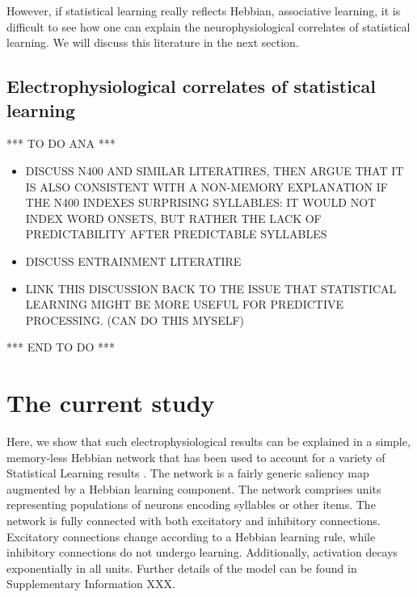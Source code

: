 \documentclass[
]{article}
\providecommand{\tightlist}{%
  \setlength{\itemsep}{0pt}\setlength{\parskip}{0pt}}
\begin{document}
However, if statistical learning really reflects Hebbian, associative
learning, it is difficult to see how one can explain the
neurophysiological correlates of statistical learning. We will discuss
this literature in the next section.

\hypertarget{electrophysiological-correlates-of-statistical-learning}{%
\subsection{Electrophysiological correlates of statistical
learning}\label{electrophysiological-correlates-of-statistical-learning}}

*** TO DO ANA ***

\citep{Batterink2017, Buiatti2009, Flo2022, Kabdebon2015, Moser2021}

\begin{itemize}
\tightlist
\item
  DISCUSS N400 AND SIMILAR LITERATIRES, THEN ARGUE THAT IT IS ALSO
  CONSISTENT WITH A NON-MEMORY EXPLANATION IF THE N400 INDEXES
  SURPRISING SYLLABLES: IT WOULD NOT INDEX WORD ONSETS, BUT RATHER THE
  LACK OF PREDICTABILITY AFTER PREDICTABLE SYLLABLES
\item
  DISCUSS ENTRAINMENT LITERATIRE
\item
  LINK THIS DISCUSSION BACK TO THE ISSUE THAT STATISTICAL LEARNING MIGHT
  BE MORE USEFUL FOR PREDICTIVE PROCESSING. (CAN DO THIS MYSELF)
\end{itemize}

*** END TO DO ***

\hypertarget{the-current-study}{%
\section{The current study}\label{the-current-study}}

Here, we show that such electrophysiological results can be explained in
a simple, memory-less Hebbian network that has been used to account for
a variety of Statistical Learning results \citep{Endress-TP-Model}. The
network is a fairly generic saliency map
\citep{Bays2010, Endress-Catastrophic-Interference, Gottlieb2007, Roggeman2010, Sengupta2014}
augmented by a Hebbian learning component. The network comprises units
representing populations of neurons encoding syllables or other items.
The network is fully connected with both excitatory and inhibitory
connections. Excitatory connections change according to a Hebbian
learning rule, while inhibitory connections do not undergo learning.
Additionally, activation decays exponentially in all units. Further
details of the model can be found in Supplementary Information XXX.
\end{document}
